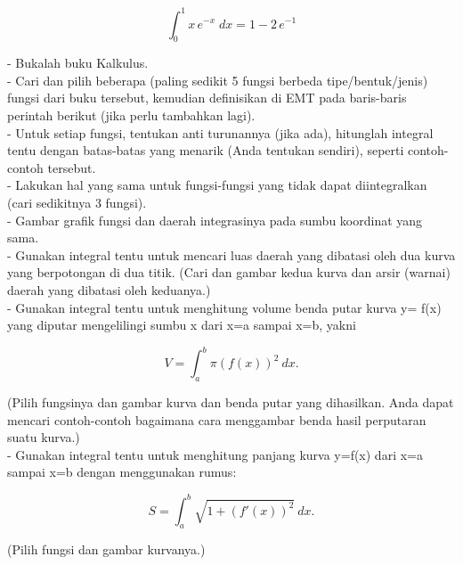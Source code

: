 \documentclass[a4paper,10pt]{article}
\begin{document}
\begin{eulernotebook}
\begin{eulercomment}
\begin{eulercomment}
\begin{eulercomment}
\begin{eulercomment}
\begin{eulercomment}
\begin{eulercomment}
\begin{eulercomment}
\begin{eulercomment}
\begin{eulercomment}
\begin{eulercomment}
\begin{euleroutput}
\end{euleroutput}
\begin{eulerformula}
\[
\int_{0}^{1}{x\,e^ {- x }\;dx}=1-2\,e^ {- 1 }
\]
\end{eulerformula}
\begin{eulercomment}
- Bukalah buku Kalkulus.\\
- Cari dan pilih beberapa (paling sedikit 5 fungsi berbeda
tipe/bentuk/jenis) fungsi dari buku tersebut, kemudian definisikan di
EMT pada baris-baris perintah berikut (jika perlu tambahkan lagi).\\
- Untuk setiap fungsi, tentukan anti turunannya (jika ada), hitunglah
integral tentu dengan batas-batas yang menarik (Anda tentukan
sendiri), seperti contoh-contoh tersebut.\\
- Lakukan hal yang sama untuk fungsi-fungsi yang tidak dapat
diintegralkan (cari sedikitnya 3 fungsi).\\
- Gambar grafik fungsi dan daerah integrasinya pada sumbu koordinat
yang sama.\\
- Gunakan integral tentu untuk mencari luas daerah yang dibatasi oleh
dua kurva yang berpotongan di dua titik. (Cari dan gambar kedua kurva
dan arsir (warnai) daerah yang dibatasi oleh keduanya.)\\
- Gunakan integral tentu untuk menghitung volume benda putar kurva y=
f(x) yang diputar mengelilingi sumbu x dari x=a sampai x=b, yakni

\end{eulercomment}
\begin{eulerformula}
\[
V = \int_a^b \pi (f(x))^2\ dx.
\]
\end{eulerformula}
\begin{eulercomment}
(Pilih fungsinya dan gambar kurva dan benda putar yang dihasilkan.
Anda dapat mencari contoh-contoh bagaimana cara menggambar benda hasil
perputaran suatu kurva.)\\
- Gunakan integral tentu untuk menghitung panjang kurva y=f(x) dari
x=a sampai x=b dengan menggunakan rumus:

\end{eulercomment}
\begin{eulerformula}
\[
S = \int_a^b \sqrt{1+(f'(x))^2} \ dx.
\]
\end{eulerformula}
\begin{eulercomment}
(Pilih fungsi dan gambar kurvanya.)


\end{eulercomment}
\end{eulercomment}
\end{eulercomment}
\end{eulercomment}
\end{eulercomment}
\end{eulercomment}
\end{eulercomment}
\end{eulercomment}
\end{eulercomment}
\end{eulercomment}
\end{eulercomment}
\end{eulernotebook}
\end{document}

